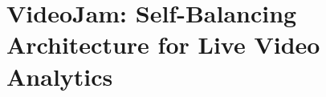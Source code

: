 \setchapterpreamble[u]{\margintoc}
\chapter{VideoJam: Self-Balancing Architecture for Live Video Analytics}











 

